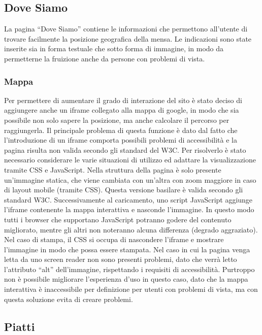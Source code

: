 \documentclass[10pt,a4paper,onecolumn]{article}
\begin{document}
\subsection{Dove Siamo}

La pagina ``Dove Siamo'' contiene le informazioni che permettono all’utente di trovare facilmente la posizione geografica della mensa. Le indicazioni sono state inserite sia in forma testuale che sotto forma di immagine, in modo da permetterne la fruizione anche da persone con problemi di vista.

\subsubsection{Mappa}

Per permettere di aumentare il grado di interazione del sito è stato deciso di aggiungere anche un iframe collegato alla mappa di google, in modo che sia possibile non solo sapere la posizione, ma anche calcolare il percorso per raggiungerla.
Il principale problema di questa funzione è dato dal fatto che l’introduzione di un iframe comporta possibili problemi di accessibilità e la pagina risulta non valida secondo gli standard del W3C.
Per risolverlo è stato necessario considerare le varie situazioni di utilizzo ed adattare la visualizzazione tramite CSS e JavaScript.
Nella struttura della pagina è solo presente un’immagine statica, che viene cambiata con un’altra con zoom maggiore in caso di layout mobile (tramite CSS). Questa versione basilare è valida secondo gli standard W3C. Successivamente al caricamento, uno script JavaScript aggiunge l’iframe contenente la mappa interattiva e nasconde l’immagine. In questo modo tutti i browser che supportano JavaScript potranno godere del contenuto migliorato, mentre gli altri non noteranno alcuna differenza (degrado aggraziato). Nel caso di stampa, il CSS si occupa di nascondere l’iframe e mostrare l’immagine in modo che possa essere stampata.
Nel caso in cui la pagina venga letta da uno screen reader non sono presenti problemi, dato che verrà letto l’attributo ``alt'' dell’immagine, rispettando i requisiti di accessibilità. Purtroppo non è possibile migliorare l’esperienza d’uso in questo caso, dato che la mappa interattiva è inaccessibile per definizione per utenti con problemi di vista, ma con questa soluzione evita di creare problemi.

\subsection{Piatti}
\end{document}
